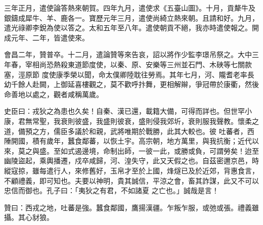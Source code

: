 \begin{pinyinscope}
 三年正月，遣使論答熱來朝賀。四年九月，遣使求《五臺山圖》。十月，貢犛牛及銀鑄成犀牛、羊、鹿各一。寶歷元年三月，遣使尚綺立熱來朝。且請和好。九月，遣光祿卿李銳為使以答之。太和五年至八年。遣使朝貢不絕，我亦時遣使報之。開成元年、二年，皆遣使來。



 會昌二年，贊普卒。十二月，遣論贊等來告哀，詔以將作少監李璟吊祭之。大中三年春，宰相尚恐熱殺東道節度使，以秦、原、安樂等三州並石門、木硤等七關款塞，涇原節
 度使康季榮以聞，命太僕卿陸耽往勞焉。其年七月，河、隴耆老率長幼千餘人赴闕，上御延喜樓觀之，莫不歡呼抃舞，更相解辮，爭冠帶於康衢，然後命善地以處之，觀者咸稱萬歲。



 史臣曰：戎狄之為患也久矣！自秦、漢已還，載籍大備，可得而詳也。但世罕小康，君無常聖，我衰則彼盛，我盛則彼衰，盛則侵我郊圻，衰則服我聲教。懷柔之道，備預之方，儒臣多議於和親，武將唯期於戰勝，此其大較也。彼
 吐蕃者，西陲開國，積有歲年，蠶食鄰蕃，以恢土宇。高宗朝，地方萬里，與我抗衡；近代以來，莫之與盛。至如式遏邊境，命制出師，一彼一此，或勝或負，可謂勞矣！迨至幽陵盜起，乘輿播遷，戍卒咸歸，河、湟失守，此又天假之也。自茲密邇京邑，時縱寇掠，雖每遣行人，來修舊好，玉帛才至於上國，烽燧已及於近郊，背惠食言，不顧禮義，即可知也。夫要以神明，貴其誠信，平涼之會，畜其詐謀，此又不可以忠信而御也。孔子曰：「夷狄之有君，不如諸夏
 之亡也。」誠哉是言！



 贊曰：西戎之地，吐蕃是強。蠶食鄰國，鷹揚漢疆。乍叛乍服，或弛或張。禮義雖攝。其心豺狼。



\end{pinyinscope}